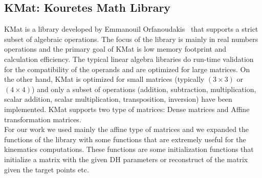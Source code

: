 \subsection{KMat: Kouretes Math Library}
KMat is a library developed by Emmanouil Orfanoudakis~\cite{orfanoudakis2011} that supports a strict subset of algebraic operations. The focus of the library is mainly in real numbers operations and the primary goal of KMat is low memory footprint and calculation efficiency. The typical linear algebra libraries do run-time validation for the compatibility of the operands and are optimized for large matrices. On the other hand, KMat is optimized for small matrices (typically \((3\times3)\) or \((4\times4)\)) and only a subset of operations (addition, subtraction, multiplication, scalar addition, scalar multiplication, transposition, inversion) have been implemented. KMat supports two type of matrices: Dense matrices and Affine transformation matrices.\\
For our work we used mainly the affine type of matrices and we expanded the functions of the library with some functions that are extremely useful for the kinematics computations. These functions are some initialization functions that initialize a matrix with the given DH parameters or reconstruct of the matrix given the target points etc.
